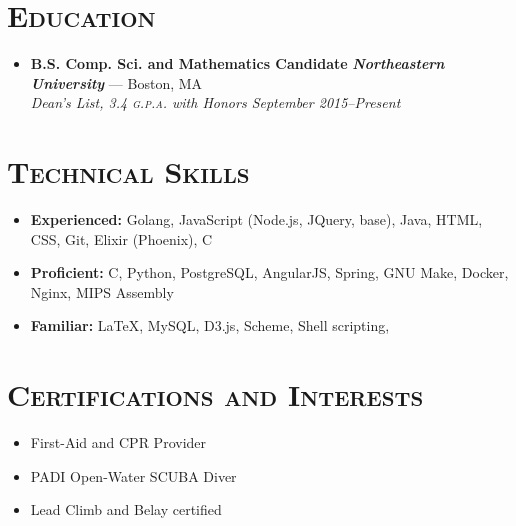 \documentclass{article}
\begin{document}
\section*{\textsc{Education}}
\begin{itemize}[label={},leftmargin=*]
\item \textbf{B.S. Comp. Sci. and Mathematics Candidate} \hfill \textit{\textbf{Northeastern University}} --- Boston, MA \\ \em{Dean's List}, 3.4 \textsc{g.p.a.} with Honors \hfill {\em September 2015--Present}
\end{itemize}



\section*{\textsc{Technical Skills}}
\begin{itemize}[label={},leftmargin=*]
\item \textbf{Experienced:} Golang, JavaScript (Node.js, JQuery, base), Java, HTML, CSS, Git, Elixir (Phoenix), C
\item \textbf{Proficient:} C, Python, PostgreSQL, AngularJS, Spring, GNU Make, Docker, Nginx, MIPS Assembly
\item \textbf{Familiar:} LaTeX, MySQL, D3.js, Scheme, Shell scripting,
\end{itemize}



\section*{\textsc{Certifications and Interests}}
\begin{itemize}[label={$\bullet$}]
\item First-Aid and CPR Provider
\item PADI Open-Water SCUBA Diver
\item Lead Climb and Belay certified
\end{itemize}
\end{document}
